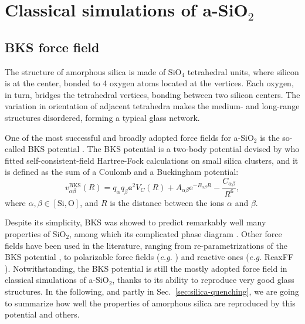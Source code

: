 \section{Classical simulations of a-SiO$_2$}  \label{sec:silica-classical}

\subsection{BKS force field}  \label{sec:silica-force-field}
The structure of amorphous silica is made of SiO$_4$ tetrahedral units, where silicon is at the center, bonded to 4 oxygen atoms located at the vertices. Each oxygen, in turn, bridges the tetrahedral vertices, bonding between two silicon centers. The variation in orientation of adjacent tetrahedra makes the medium- and long-range structures disordered, forming a typical glass network.

One of the most successful and broadly adopted force fields for a-SiO$_2$ is the so-called BKS potential \cite{Silica-BKS-1990}. 
The BKS potential is a two-body potential devised by \citeauthor*{Silica-BKS-1990} who fitted self-consistent-field Hartree-Fock calculations on small silica clusters, and it is defined as the sum of a Coulomb and a Buckingham potential:
\begin{equation}
    v_{\alpha\beta}^{\mathrm{BKS}}(R) = q_\alpha q_\beta \mathtt{e}^2 V_C(R) + A_{\alpha\beta}\mathrm{e}^{-B_{\alpha\beta}R} - \frac{C_{\alpha\beta}}{R^6}, \label{eq:BKS}
\end{equation}
where $\alpha,\beta \in [\text{Si},\text{O}]$, and $R$ is the distance between the ions $\alpha$ and $\beta$. 

Despite its simplicity, BKS was showed to predict remarkably well many properties of SiO$_2$, among which its complicated phase diagram \cite{Saika2004}. 
Other force fields have been used in the literature, ranging from re-parametrizations of the BKS potential \cite{Carre2008}, to polarizable force fields (\emph{e.g.} \citet{Tangney2002}) and reactive ones (\emph{e.g.} ReaxFF \cite{Yuan2001}). 
Notwithstanding, the BKS potential is still the mostly adopted force field in classical simulations of a-SiO$_2$, thanks to its ability to reproduce very good glass structures. 
In the following, and partly in Sec.~\ref{sec:silica-quenching}, we are going to summarize how well the properties of amorphous silica are reproduced by this potential and others.


